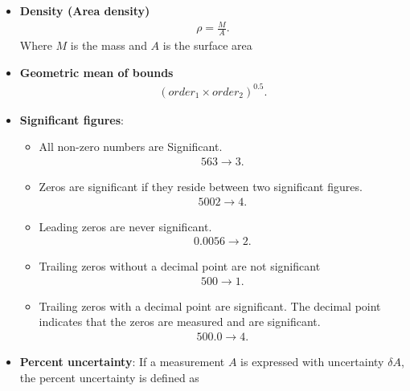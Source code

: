 \documentclass{report}
\begin{document}
\begin{itemize}
        \item \textbf{Density (Area density)}
            \begin{align*}
                \rho = \frac{M}{A}
            .\end{align*}
            Where $M$ is the mass and $A$ is the surface area
        \item \textbf{Geometric mean of bounds}
            \begin{align*}
                (order_{1} \times order_{2})^{0.5}
            .\end{align*}
        \item \textbf{Significant figures}: 
            \begin{itemize}
                \item All non-zero numbers are Significant.
                    \begin{align*}
                        563 \rightarrow 3
                    .\end{align*}
                \item Zeros are significant if they reside between two significant figures.
                    \begin{align*}
                        5002 \rightarrow 4
                    .\end{align*}
                \item Leading zeros are never significant. 
                    \begin{align*}
                        0.0056 \rightarrow 2
                    .\end{align*}
                \item Trailing zeros without a decimal point are not significant
                    \begin{align*}
                        500 \rightarrow 1
                    .\end{align*}
                \item Trailing zeros with a decimal point are significant. The decimal point indicates that the zeros are measured and are significant. 
                    \begin{align*}
                        500.0 \rightarrow 4
                    .\end{align*}
            \end{itemize}
        \item \textbf{Percent uncertainty}: If a measurement \( A \) is expressed with uncertainty \( \delta A \), the percent uncertainty is defined as

\end{itemize}
\end{document}
